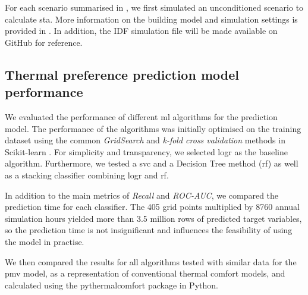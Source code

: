 For each scenario summarised in , we first simulated an unconditioned scenario to calculate \gls{sta}. More information on the building model and simulation settings is provided in . In addition, the IDF simulation file will be made available on GitHub for reference.





\subsection{Thermal preference prediction model performance}
\label{sec:results-ml}

We evaluated the performance of different \gls{ml} algorithms for the prediction model. The performance of the algorithms was initially optimised on the training dataset using the common \textit{GridSearch} and \textit{k-fold cross validation} methods in Scikit-learn \citep{Pedregosa2011}. For simplicity and transparency, we selected \gls{logr} as the baseline algorithm. Furthermore, we tested a \gls{svc} and a Decision Tree method (\gls{rf}) as well as a stacking classifier combining \gls{logr} and \gls{rf}.

In addition to the main metrics of \textit{Recall}  and \textit{ROC-AUC}, we compared the prediction time for each classifier. The 405 grid points multiplied by 8760 annual simulation hours yielded more than 3.5 million rows of predicted target variables, so the prediction time is not insignificant and influences the feasibility of using the model in practise.

We then compared the results for all algorithms tested with similar data for the \gls{pmv} model, as a representation of conventional thermal comfort models, and calculated using the pythermalcomfort package \citep{TartariniPythermalComfort2020} in Python.


